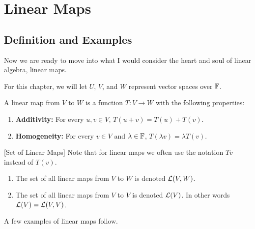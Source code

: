 \chapter{Linear Maps}
\section{Definition and Examples}
Now we are ready to move into what I would consider the heart and soul of linear algebra, linear maps.

For this chapter, we will let $U$, $V$, and $W$ represent vector spaces over $\mathbb F$.
\begin{definition}
    A linear map from $V$ to $W$ is a function $T: V\to W$ with the following properties:
    \begin{enumerate}
        \item \textbf{Additivity:}  For every $u,v\in V$, $T(u + v) = T(u) +T(v)$.
        \item \textbf{Homogeneity:} For every $v\in V$ and $\lambda \in \mathbb F$, $T(\lambda v) = \lambda T(v)$.
    \end{enumerate}
\end{definition}[Set of Linear Maps]
Note that for linear maps we often use the notation $Tv$ instead of $T(v)$.
\begin{definition}
    \begin{enumerate}
        \item The set of all linear maps from $V$ to $W$ is denoted $\mathcal{L}(V,W)$.
        \item The set of all linear maps from $V$ to $V$ is denoted $\mathcal{L}(V)$. In other words $\mathcal{L}(V) = \mathcal{L}(V,V)$.
    \end{enumerate}
\end{definition}
A few examples of linear maps follow.

